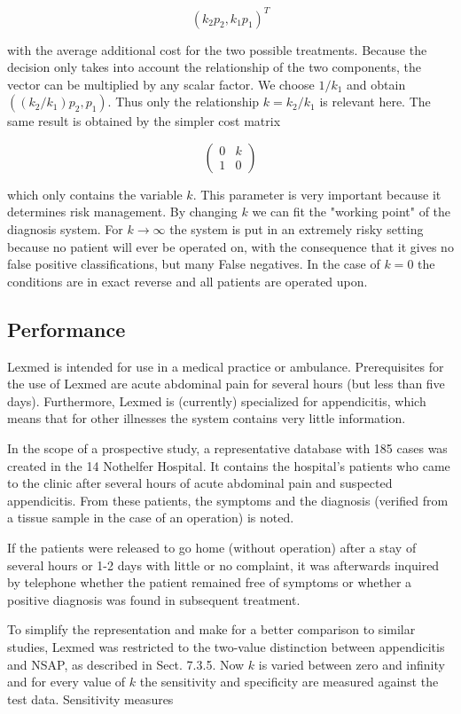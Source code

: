 \documentclass[10pt]{book}
\begin{document}
$$
\left(k_{2} p_{2}, k_{1} p_{1}\right)^{T}
$$

with the average additional cost for the two possible treatments. Because the decision only takes into account the relationship of the two components, the vector can be multiplied by any scalar factor. We choose $1 / k_{1}$ and obtain $\left(\left(k_{2} / k_{1}\right) p_{2}, p_{1}\right)$. Thus only the relationship $k=k_{2} / k_{1}$ is relevant here. The same result is obtained by the simpler cost matrix

$$
\left(\begin{array}{ll}
0 & k \\
1 & 0
\end{array}\right)
$$

which only contains the variable $k$. This parameter is very important because it determines risk management. By changing $k$ we can fit the "working point" of the diagnosis system. For $k \rightarrow \infty$ the system is put in an extremely risky setting because no patient will ever be operated on, with the consequence that it gives no false positive classifications, but many False negatives. In the case of $k=0$ the conditions are in exact reverse and all patients are operated upon.

\subsection{Performance}
Lexmed is intended for use in a medical practice or ambulance. Prerequisites for the use of Lexmed are acute abdominal pain for several hours (but less than five days). Furthermore, Lexmed is (currently) specialized for appendicitis, which means that for other illnesses the system contains very little information.

In the scope of a prospective study, a representative database with 185 cases was created in the 14 Nothelfer Hospital. It contains the hospital's patients who came to the clinic after several hours of acute abdominal pain and suspected appendicitis. From these patients, the symptoms and the diagnosis (verified from a tissue sample in the case of an operation) is noted.

If the patients were released to go home (without operation) after a stay of several hours or 1-2 days with little or no complaint, it was afterwards inquired by telephone whether the patient remained free of symptoms or whether a positive diagnosis was found in subsequent treatment.

To simplify the representation and make for a better comparison to similar studies, Lexmed was restricted to the two-value distinction between appendicitis and NSAP, as described in Sect. 7.3.5. Now $k$ is varied between zero and infinity\\
and for every value of $k$ the sensitivity and specificity are measured against the test data. Sensitivity measures
\end{document}
